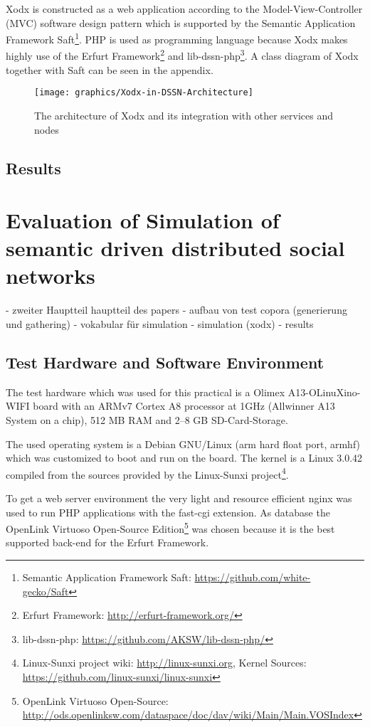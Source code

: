 \documentclass{llncs}
\begin{document}
Xodx is constructed as a web application according to the Model-View-Controller (MVC) software design pattern which is supported by the Semantic Application Framework Saft\footnote{Semantic Application Framework Saft: \url{https://github.com/white-gecko/Saft}}.
PHP is used as programming language because Xodx makes highly use of the Erfurt Framework\footnote{Erfurt Framework: \url{http://erfurt-framework.org/}} and lib-dssn-php\footnote{lib-dssn-php: \url{https://github.com/AKSW/lib-dssn-php/}}.
A class diagram of Xodx together with Saft can be seen in the appendix.

\begin{figure}
    \begin{center}
        \texttt{[image: graphics/Xodx-in-DSSN-Architecture]}
    \end{center}
\caption{The architecture of Xodx and its integration with other services and nodes}
\label{Xodx_arch}
\end{figure}


\subsection{Results}


\section{Evaluation of Simulation of semantic driven distributed social networks}

- zweiter Hauptteil hauptteil des papers
- aufbau von test copora (generierung und gathering)
- vokabular für simulation
- simulation (xodx)
- results

\subsection{Test Hardware and Software Environment}
The test hardware which was used for this practical is a Olimex A13-OLinuXino-WIFI board with an ARMv7 Cortex A8 processor at 1GHz (Allwinner A13 System on a chip), 512 MB RAM and 2–8 GB SD-Card-Storage.

The used operating system is a Debian GNU/Linux (arm hard float port, armhf) which was customized to boot and run on the board.
The kernel is a Linux 3.0.42 compiled from the sources provided by the Linux-Sunxi project\footnote{Linux-Sunxi project wiki: \url{http://linux-sunxi.org}, Kernel Sources: \url{https://github.com/linux-sunxi/linux-sunxi}}.

To get a web server environment the very light and resource efficient nginx was used to run PHP applications with the fast-cgi extension.
As database the Open\-Link Vir\-tu\-oso Open-Source Edition\footnote{Open\-Link Vir\-tu\-oso Open-Source: \url{http://ods.openlinksw.com/dataspace/doc/dav/wiki/Main/Main.VOSIndex}} was chosen because it is the best supported back-end for the Erfurt Framework.




\end{document}
